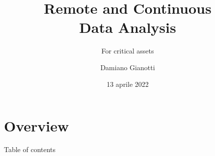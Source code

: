 \documentclass[UKenglish, dvipsnames]{beamer}
\author[Damiano Gianotti]{Damiano Gianotti}
\title{Remote and Continuous\\ Data Analysis}
\subtitle{For critical assets}
\date{13 aprile 2022}
\begin{document}
\section{Overview}
\begin{frame}{Table of contents}
    \tableofcontents[currentsection]
\end{frame}






% 


% 
\end{document}

